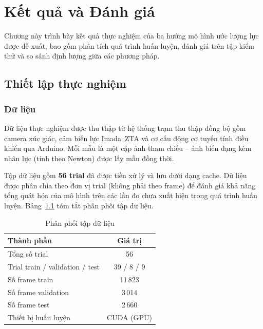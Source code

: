 
\chapter{Kết quả và Đánh giá}
\label{chap:results}

Chương này trình bày kết quả thực nghiệm của ba hướng mô hình ước lượng lực
được đề xuất, bao gồm phân tích quá trình huấn luyện, đánh giá trên tập
kiểm thử và so sánh định lượng giữa các phương pháp.

\section{Thiết lập thực nghiệm}
\label{sec:exp_setup}

\subsection{Dữ liệu}

Dữ liệu thực nghiệm được thu thập từ hệ thống trạm thu thập đồng bộ gồm
camera xúc giác, cảm biến lực Imada~ZTA và cơ cấu động cơ tuyến tính điều
khiển qua Arduino. Mỗi mẫu là một cặp ảnh tham chiếu -- ảnh biến dạng kèm
nhãn lực (tính theo Newton) được lấy mẫu đồng thời.

Tập dữ liệu gồm \textbf{56 trial} đã được tiền xử lý và lưu dưới dạng cache.
Dữ liệu được phân chia theo đơn vị trial (không phải theo frame) để đánh giá
khả năng tổng quát hóa của mô hình trên các lần đo chưa xuất hiện trong quá
trình huấn luyện. Bảng~\ref{tab:dataset} tóm tắt phân phối tập dữ liệu.

\begin{table}[h]
\centering
\caption{Phân phối tập dữ liệu}
\label{tab:dataset}
\begin{tabular}{lc}
\toprule
\textbf{Thành phần} & \textbf{Giá trị} \\
\midrule
Tổng số trial & 56 \\
Trial train / validation / test & 39 / 8 / 9 \\
Số frame train & 11\,823 \\
Số frame validation & 3\,014 \\
Số frame test & 2\,660 \\
Thiết bị huấn luyện & CUDA (GPU) \\
\bottomrule
\end{tabular}
\end{table}

